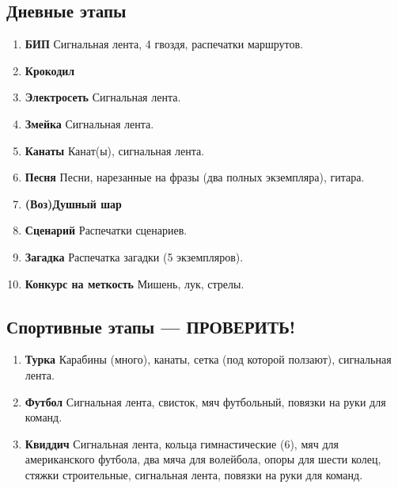 
\subsection*{Дневные этапы}
	\begin{enumerate}
	\item \textbf{БИП} Сигнальная лента, 4 гвоздя, распечатки маршрутов.
	\item \textbf{Крокодил}
	\item \textbf{Электросеть} Сигнальная лента.
	\item \textbf{Змейка} Сигнальная лента.
	\item \textbf{Канаты} Канат(ы), сигнальная лента.
	\item \textbf{Песня} Песни, нарезанные на фразы (два полных экземпляра), гитара.
	\item \textbf{(Воз)Душный шар}
	\item \textbf{Сценарий} Распечатки сценариев.
	\item \textbf{Загадка} Распечатка загадки (5 экземпляров).
	\item \textbf{Конкурс на меткость} Мишень, лук, стрелы.
	\end{enumerate}
	
\subsection*{Спортивные этапы --- ПРОВЕРИТЬ!}
	\begin{enumerate}
	\item \textbf{Турка} Карабины (много), канаты, сетка (под которой ползают), сигнальная лента.
	\item \textbf{Футбол} Сигнальная лента, свисток, мяч футбольный, повязки на руки для команд.
	\item \textbf{Квиддич} Сигнальная лента, кольца гимнастические (6), мяч для американского футбола, два мяча для волейбола, опоры для шести колец, стяжки строительные, сигнальная лента, повязки на руки для команд.
	\end{enumerate}
	
